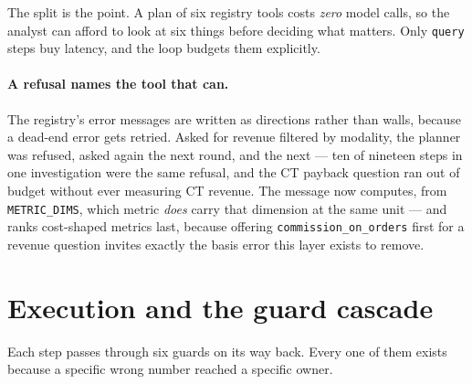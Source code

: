 \documentclass[11pt,a4paper]{report}
\newcommand{\code}[1]{\texttt{\small #1}}
\begin{document}
\noindent The split is the point. A plan of six registry tools costs \emph{zero} model calls, so
the analyst can afford to look at six things before deciding what matters. Only \code{query} steps
buy latency, and the loop budgets them explicitly.

\paragraph{A refusal names the tool that can.} The registry's error messages are written as
directions rather than walls, because a dead-end error gets retried. Asked for revenue filtered by
modality, the planner was refused, asked again the next round, and the next --- ten of nineteen
steps in one investigation were the same refusal, and the CT payback question ran out of budget
without ever measuring CT revenue. The message now computes, from \code{METRIC\_DIMS}, which metric
\emph{does} carry that dimension at the same unit --- and ranks cost-shaped metrics last, because
offering \code{commission\_on\_orders} first for a revenue question invites exactly the basis error
this layer exists to remove.

\section{Execution and the guard cascade}

Each step passes through six guards on its way back. Every one of them exists because a specific
wrong number reached a specific owner.
\end{document}
